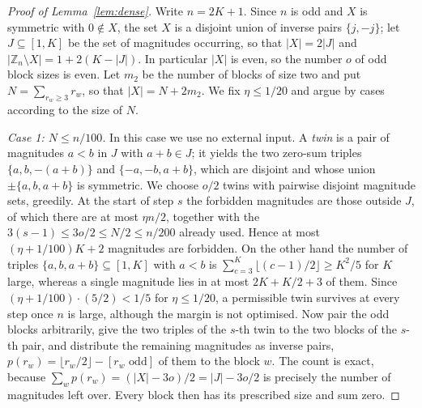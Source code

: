 \documentclass[11pt,a4paper]{article}
\theoremstyle{plain}
\theoremstyle{definition}
\theoremstyle{remark}
\newcommand{\Z}{\mathbb{Z}}
\begin{document}
\begin{proof}[Proof of Lemma~\ref{lem:dense}]
Write $n=2K+1$.  Since $n$ is odd and $X$ is symmetric with $0\notin X$, the set
$X$ is a disjoint union of inverse pairs $\{j,-j\}$; let $J\subseteq[1,K]$ be
the set of magnitudes occurring, so that $|X|=2|J|$ and
$|\Z_n\setminus X|=1+2(K-|J|)$.  In particular $|X|$ is even, so the number
$o$ of odd block sizes is even.  Let $m_2$ be the number of blocks of size two
and put $N=\sum_{r_w\ge3}r_w$, so that $|X|=N+2m_2$.  We fix
$\eta\le1/20$ and argue by cases according to the size of $N$.

\emph{Case 1: $N\le n/100$.}  In this case we use no external input.  A
\emph{twin} is a pair of magnitudes $a<b$ in $J$ with $a+b\in J$; it yields the
two zero-sum triples $\{a,b,-(a+b)\}$ and $\{-a,-b,a+b\}$, which are disjoint
and whose union $\pm\{a,b,a+b\}$ is symmetric.  We choose $o/2$ twins with
pairwise disjoint magnitude sets, greedily.  At the start of step $s$ the
forbidden magnitudes are those outside $J$, of which there are at most
$\eta n/2$, together with the $3(s-1)\le 3o/2\le N/2\le n/200$ already used.
Hence at most $(\eta+1/100)K+2$ magnitudes are forbidden.  On the other hand
the number of triples $\{a,b,a+b\}\subseteq[1,K]$ with $a<b$ is
$\sum_{c=3}^{K}\lfloor(c-1)/2\rfloor\ge K^2/5$ for $K$ large, whereas a single
magnitude lies in at most $2K+K/2+3$ of them.  Since
$(\eta+1/100)\cdot(5/2)<1/5$ for $\eta\le1/20$, a permissible twin survives at
every step once $n$ is large, although the margin is not optimised.  Now pair
the odd blocks arbitrarily, give the two triples of the $s$-th twin to the two
blocks of the $s$-th pair, and distribute the remaining magnitudes as inverse
pairs, $p(r_w)=\lfloor r_w/2\rfloor-[r_w\text{ odd}]$ of them to the block
$w$.  The count is exact, because
$\sum_w p(r_w)=(|X|-3o)/2=|J|-3o/2$ is precisely the number of magnitudes left
over.  Every block then has its prescribed size and sum zero.


\end{proof}
\end{document}
